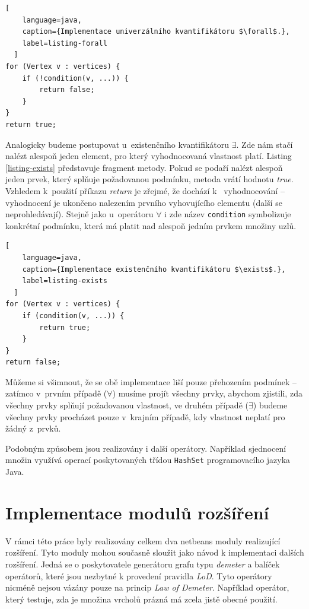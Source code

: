 \begin{lstlisting}[
    language=java,
    caption={Implementace univerzálního kvantifikátoru $\forall$.},
    label=listing-forall
  ]
for (Vertex v : vertices) {
    if (!condition(v, ...)) {
        return false;
    }
}
return true;
\end{lstlisting}

Analogicky budeme postupovat u~existenčního kvantifikátoru $\exists$. Zde nám stačí nalézt alespoň jeden element, pro který vyhodnocovaná vlastnost platí. Listing \ref{listing-exists} představuje fragment metody. Pokud se podaří nalézt alespoň jeden prvek, který splňuje požadovanou podmínku, metoda vrátí hodnotu \emph{true}. Vzhledem k~použití příkazu \emph{return} je zřejmé, že dochází k~ vyhodnocování -- vyhodnocení je ukončeno nalezením prvního vyhovujícího elementu (další se neprohledávají). Stejně jako u~operátoru $\forall$ i zde název \verb+condition+ symbolizuje konkrétní podmínku, která má platit nad alespoň jedním prvkem množiny uzlů.

\begin{lstlisting}[
    language=java,
    caption={Implementace existenčního kvantifikátoru $\exists$.},
    label=listing-exists
  ]
for (Vertex v : vertices) {
    if (condition(v, ...)) {
        return true;
    }
}
return false;
\end{lstlisting}

Můžeme si všimnout, že se obě implementace liší pouze přehozením podmínek -- zatímco v~prvním případě ($\forall$) musíme projít všechny prvky, abychom zjistili, zda všechny prvky splňují požadovanou vlastnost, ve druhém případě ($\exists$) budeme všechny prvky procházet pouze v~krajním případě, kdy vlastnost neplatí pro žádný z~prvků.

Podobným způsobem jsou realizovány i další operátory. Například sjednocení množin využívá operací poskytovaných třídou \verb-HashSet- programovacího jazyka Java.

\section{Implementace modulů rozšíření}
V rámci této práce byly realizovány celkem dva netbeans moduly realizující rozšíření. Tyto moduly mohou současně sloužit jako návod k implementaci dalších rozšíření. Jedná se o poskytovatele generátoru grafu typu \emph{demeter} a balíček operátorů, které jsou nezbytné k provedení pravidla \emph{LoD}. Tyto operátory nicméně nejsou vázány pouze na princip \emph{Law of Demeter}. Například operátor, který testuje, zda je množina vrcholů prázná má zcela jistě obecné použití.

